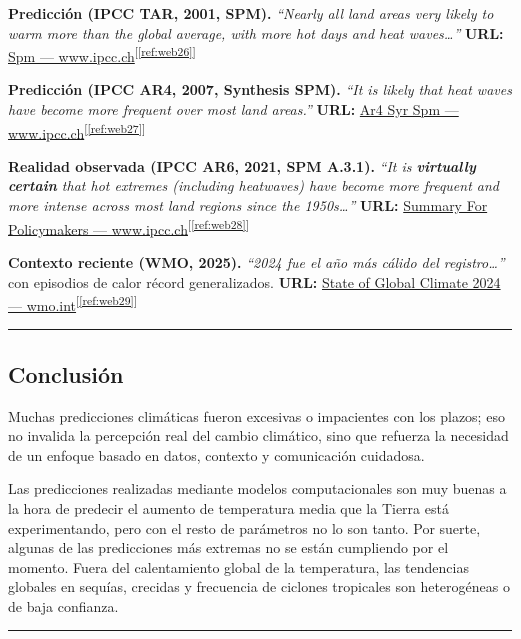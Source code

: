 \documentclass[
  10pt,
  a4paper,
  DIV=11,
  numbers=noendperiod,
  open=any]{scrreprt}
\numberwithin{equation}{chapter}
\numberwithin{equation}{section}
\renewcommand{\[}{\begin{equation}}
\renewcommand{\]}{\end{equation}}
\newcommand{\refweb}[3]{%
  \href{#1}{#2}\textsuperscript{[\ref{ref:#3}]}%
}
\begin{document}
\textbf{Predicción (IPCC TAR, 2001, SPM).} \emph{“Nearly all land areas very likely to warm more than the global average, with more hot days and heat waves…”} 
\textbf{URL:} \refweb{https://www.ipcc.ch/site/assets/uploads/2018/03/spm.pdf}{Spm — www.ipcc.ch}{web26}

\textbf{Predicción (IPCC AR4, 2007, Synthesis SPM).} \emph{“It is likely that heat waves have become more frequent over most land areas.”}
\textbf{URL:} \refweb{https://www.ipcc.ch/pdf/assessment-report/ar4/syr/ar4_syr_spm.pdf}{Ar4 Syr Spm — www.ipcc.ch}{web27}

\textbf{Realidad observada (IPCC AR6, 2021, SPM A.3.1).} \emph{“It is \textbf{virtually certain} that hot extremes (including heatwaves) have become more frequent and more intense across most land regions since the 1950s…”}
\textbf{URL:} \refweb{https://www.ipcc.ch/report/ar6/wg1/chapter/summary-for-policymakers/}{Summary For Policymakers — www.ipcc.ch}{web28}

\textbf{Contexto reciente (WMO, 2025).} \emph{“2024 fue el año más cálido del registro…”} con episodios de calor récord generalizados.
\textbf{URL:} \refweb{https://wmo.int/publication-series/state-of-global-climate-2024}{State of Global Climate 2024 — wmo.int}{web29}

\begin{center}\rule{0.5\linewidth}{0.5pt}\end{center}

\subsection{Conclusión}\label{conclusiuxf3n}

Muchas predicciones climáticas fueron excesivas o impacientes con los
plazos; eso no invalida la percepción real del cambio climático, sino
que refuerza la necesidad de un enfoque basado en datos, contexto y
comunicación cuidadosa.

Las predicciones realizadas mediante modelos computacionales son muy
buenas a la hora de predecir el aumento de temperatura media que la
Tierra está experimentando, pero con el resto de parámetros no lo son
tanto. Por suerte, algunas de las predicciones más extremas no se están cumpliendo
por el momento. Fuera del calentamiento global de la temperatura, las tendencias globales en sequías, crecidas y frecuencia de ciclones tropicales son heterogéneas o de baja confianza. 

\begin{center}\rule{0.5\linewidth}{0.5pt}\end{center}
\end{document}
